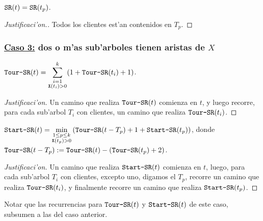 \begin{claim}
$\texttt{SR}(t) = \texttt{SR}(t_p)$.

\begin{proof}[Justificaci'on.]
Todos los clientes est'an contenidos en $T_p$.
\end{proof}
\end{claim}

\subsubsection*{\underline{Caso 3:} dos o m'as sub'arboles tienen aristas de $X$}

\begin{claim}
$\texttt{Tour-SR}(t) = \displaystyle\sum_{\substack{i = 1 \\ \texttt{X}(t_i) > 0}}^k(1 + \texttt{Tour-SR}(t_i) + 1)$.

\begin{proof}[Justificaci'on]
Un camino que realiza $\texttt{Tour-SR}(t)$ comienza en $t$, y luego recorre, para cada sub'arbol $T_i$ con clientes, un camino que realiza $\texttt{Tour-SR}(t_i)$.
\end{proof}
\end{claim}

\begin{claim}
\label{cl:recurrencia_sr_2}
$\texttt{Start-SR}(t) = \min\limits_{\substack{1 \leq p \leq k \\ \texttt{X}(t_p) > 0}}\left(\texttt{Tour-SR}(t - T_p) + 1 + \texttt{Start-SR}(t_p)\right)$, donde $\texttt{Tour-SR}(t - T_p) := \texttt{Tour-SR}(t) - (\texttt{Tour-SR}(t_p) + 2)$.

\begin{proof}[Justificaci'on]
Un camino que realiza $\texttt{Start-SR}(t)$ comienza en $t$, luego, para cada sub'arbol $T_i$ con clientes, excepto uno, digamos el $T_p$, recorre un camino que realiza $\texttt{Tour-SR}(t_i)$, y finalmente recorre un camino que realiza $\texttt{Start-SR}(t_p)$.
\end{proof}
\end{claim}

Notar que las recurrencias para $\texttt{Tour-SR}(t)$ y $\texttt{Start-SR}(t)$ de este caso, subsumen a las del caso anterior.

